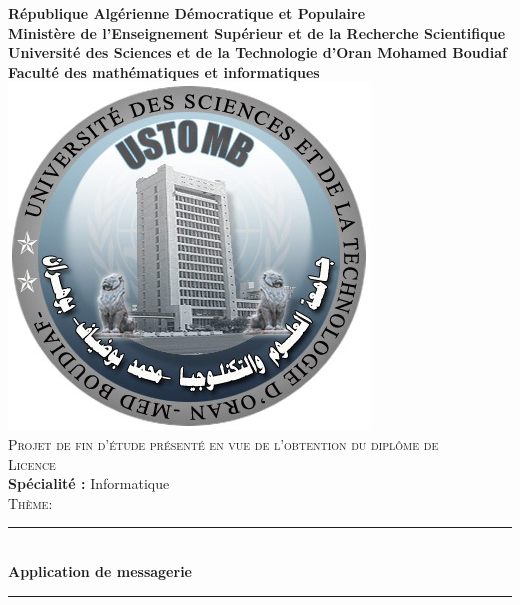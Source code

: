 \documentclass[12pt, openany]{report}
\newcommand{\HRule}{\rule{\linewidth}{0.5mm}}
\begin{document}
\begin{titlepage}
  \begin{sffamily}
  \begin{center}


    \textbf{\large République Algérienne Démocratique et Populaire}\\[0.2cm]
    \textbf{\large Ministère de l’Enseignement Supérieur et de la Recherche Scientifique}\\[0.2cm]
    \textbf{\large Université des Sciences et de la Technologie d’Oran Mohamed Boudiaf}\\[0.2cm]
    \textbf{\large Faculté des mathématiques et informatiques}\\[1.0cm]

  \includegraphics[scale=0.8]{Ustomb.JPG}
    \\[2cm]

	\textsc{\Large Projet de fin d'étude présenté en vue de l'obtention du diplôme de}\\[0.1cm]
	\textsc{\Large Licence}\\[0.5cm]
    \textbf{Spécialité : }Informatique\\[0.2cm]
    \textsc{\Large Thème:}\\[0.2cm]
    \HRule \\[0.4cm]
    { \huge \bfseries Application de messagerie \\[0.4cm] }

    \HRule \\[2cm]
    


\end{center}
\end{sffamily}
\end{titlepage}
\end{document}
